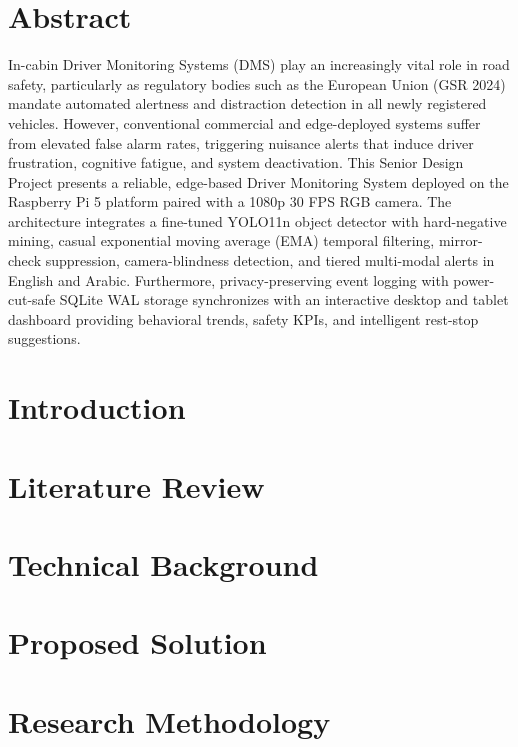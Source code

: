 \documentclass[12pt]{report}
\begin{document}
\chapter*{Abstract}
In-cabin Driver Monitoring Systems (DMS) play an increasingly vital role in road safety, particularly as regulatory bodies such as the European Union (GSR 2024) mandate automated alertness and distraction detection in all newly registered vehicles. However, conventional commercial and edge-deployed systems suffer from elevated false alarm rates, triggering nuisance alerts that induce driver frustration, cognitive fatigue, and system deactivation. This Senior Design Project presents a reliable, edge-based Driver Monitoring System deployed on the Raspberry Pi 5 platform paired with a 1080p 30 FPS RGB camera. The architecture integrates a fine-tuned YOLO11n object detector with hard-negative mining, casual exponential moving average (EMA) temporal filtering, mirror-check suppression, camera-blindness detection, and tiered multi-modal alerts in English and Arabic. Furthermore, privacy-preserving event logging with power-cut-safe SQLite WAL storage synchronizes with an interactive desktop and tablet dashboard providing behavioral trends, safety KPIs, and intelligent rest-stop suggestions.


\chapter{Introduction}


\chapter{Literature Review}


\chapter{Technical Background}


\chapter{Proposed Solution}


\chapter{Research Methodology}




\end{document}
